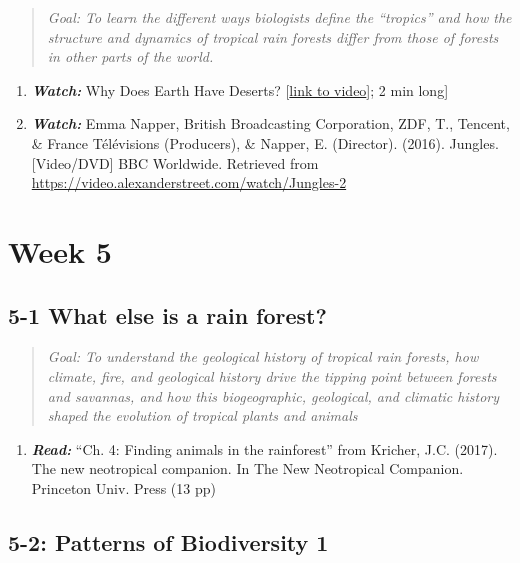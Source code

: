 \documentclass[
  10pt,
  letterpaper,
  oneside,
  open=any]{scrbook}
\providecommand{\tightlist}{%
  \setlength{\itemsep}{0pt}\setlength{\parskip}{0pt}}\usepackage{longtable,booktabs,array}
\begin{document}
\begin{quote}
\emph{Goal: To learn the different ways biologists define the
``tropics'' and how the structure and dynamics of tropical rain forests
differ from those of forests in other parts of the world.}
\end{quote}

\begin{enumerate}
\def\labelenumi{\arabic{enumi}.}
\item
  \textbf{\emph{Watch:}} Why Does Earth Have Deserts?
  {[}\href{https://www.youtube.com/watch?v=T6Us1sPXBfA}{link to
  video}{]}; 2 min long{]}
\item
  \textbf{\emph{Watch:}} Emma Napper, British Broadcasting Corporation,
  ZDF, T., Tencent, \& France Télévisions (Producers), \& Napper, E.
  (Director). (2016). Jungles. {[}Video/DVD{]} BBC Worldwide. Retrieved
  from \url{https://video.alexanderstreet.com/watch/Jungles-2}
\end{enumerate}

\section{Week 5}\label{week-5}

\subsection*{5-1 What else is a rain
forest?}\label{what-else-is-a-rain-forest}

\begin{quote}
\emph{Goal: To understand the geological history of tropical rain
forests, how climate, fire, and geological history drive the tipping
point between forests and savannas, and how this biogeographic,
geological, and climatic history shaped the evolution of tropical plants
and animals}
\end{quote}

\begin{enumerate}
\def\labelenumi{\arabic{enumi}.}
\tightlist
\item
  \textbf{\emph{Read:}} ``Ch. 4: Finding animals in the rainforest''
  from Kricher, J.C. (2017). The new neotropical companion. In The New
  Neotropical Companion. Princeton Univ. Press (13 pp)
\end{enumerate}

\subsection*{5-2: Patterns of Biodiversity
1}\label{patterns-of-biodiversity-1}
\end{document}
